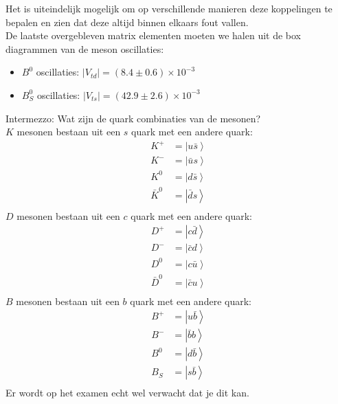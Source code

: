 \documentclass[../main.tex]{subfiles}
\begin{document}
Het is uiteindelijk mogelijk om op verschillende manieren deze koppelingen te bepalen en zien dat deze altijd binnen elkaars fout vallen.\\
De laatste overgebleven matrix elementen moeten we halen uit de box diagrammen van de meson oscillaties:
\begin{itemize}
    \item $B^0$ oscillaties: $\left|V_{t d}\right|=(8.4 \pm 0.6) \times 10^{-3}$
    \item $B_S^0$ oscillaties: $\left|V_{t s}\right|=(42.9 \pm 2.6) \times 10^{-3}$
\end{itemize}
{\color{blue} Intermezzo: Wat zijn de quark combinaties van de mesonen?\\
    $K$ mesonen bestaan uit een $s$ quark met een andere quark:
    \begin{equation}
        \begin{aligned}
            \label{eq:k_meson_samenstelling}
            K^+ &= \left| u\bar{s}\right>\\
            K^- &= \left| \bar{u}s\right>\\
            K^0 &= \left| d\bar{s}\right>\\
            \bar{K}^0 &= \left| \bar{d}s\right>\\
        \end{aligned}
    \end{equation}
    $D$ mesonen bestaan uit een $c$ quark met een andere quark:
    \begin{equation}
        \begin{aligned}
            \label{eq:d_meson_samenstelling}
            D^+ &= \left| c\bar{d}\right>\\
            D^- &= \left| \bar{c}d\right>\\
            D^0 &= \left| c\bar{u}\right>\\
            \bar{D}^0 &= \left| \bar{c}u\right>\\
        \end{aligned}
    \end{equation}
    $B$ mesonen bestaan uit een $b$ quark met een andere quark:
    \begin{equation}
        \begin{aligned}
            \label{eq:d_meson_samenstelling}
            B^+ &= \left| u\bar{b}\right>\\
            B^- &= \left| \bar{b}b\right>\\
            B^0 &= \left| d\bar{b}\right>\\
            B_S &= \left| s\bar{b}\right>\\
        \end{aligned}
    \end{equation}
    Er wordt op het examen echt wel verwacht dat je dit kan.
}
\end{document}
